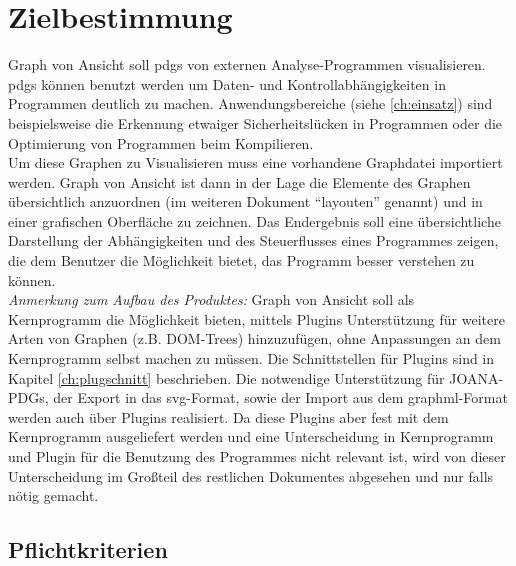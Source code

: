 \chapter{Zielbestimmung}
Graph von Ansicht soll \glspl{pdg} von externen Analyse-Programmen visualisieren.
\glspl{pdg} können benutzt werden um Daten- und Kontrollabhängigkeiten in Programmen deutlich zu machen.
Anwendungsbereiche (siehe \ref{ch:einsatz}) sind beispielsweise die Erkennung etwaiger Sicherheitslücken\cite{hammer09ijis} in Programmen
oder die Optimierung von Programmen beim Kompilieren\cite{Ferrante:1987:PDG:24039.24041}.\\
Um diese Graphen zu Visualisieren muss eine vorhandene Graphdatei importiert werden.
Graph von Ansicht ist dann in der Lage die Elemente des Graphen übersichtlich anzuordnen (im weiteren Dokument ``layouten'' genannt) und in einer grafischen Oberfläche zu zeichnen.
Das Endergebnis soll eine übersichtliche Darstellung der Abhängigkeiten und des Steuerflusses eines Programmes zeigen, die dem Benutzer die Möglichkeit bietet, das Programm besser verstehen zu können.\\

\textit{Anmerkung zum Aufbau des Produktes:} Graph von Ansicht soll als Kernprogramm die Möglichkeit bieten,
mittels Plugins Unterstützung für weitere Arten von Graphen (z.B. DOM-Trees)
hinzuzufügen, ohne Anpassungen an dem Kernprogramm selbst machen zu müssen.
Die Schnittstellen für Plugins sind in Kapitel \ref{ch:plugschnitt} beschrieben.
Die notwendige Unterstützung für JOANA-PDGs, der Export in das \gls{svg}-Format, sowie der Import aus dem \gls{graphml}-Format werden auch über Plugins realisiert.
Da diese Plugins aber fest mit dem Kernprogramm ausgeliefert werden und eine Unterscheidung in Kernprogramm und Plugin für die Benutzung des
Programmes nicht relevant ist, wird von dieser Unterscheidung im Großteil des restlichen Dokumentes abgesehen und nur falls nötig gemacht.

\section{Pflichtkriterien}

